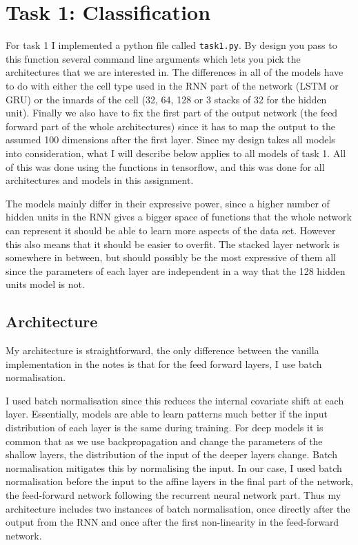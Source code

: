 \documentclass{article}
\begin{document}
\section{Task 1: Classification}

For task 1 I implemented a python file called \texttt{task1.py}. By design you
pass to this function several command line arguments which lets you pick the
architectures that we are interested in. The differences in all of the models
have to do with either the cell type used in the RNN part of the network (LSTM
or GRU) or the innards of the cell (32, 64, 128 or 3 stacks of 32 for the hidden
unit). Finally we also have to fix the first part of the output network (the
feed forward part of the whole architectures) since it has to map the output to
the assumed 100 dimensions after the first layer. Since my design takes all
models into consideration, what I will describe below applies to all models of
task 1. All of this was done using the functions in tensorflow, and this was
done for all architectures and models in this assignment.

The models mainly differ in their expressive power, since a higher number of
hidden units in the RNN gives a bigger space of functions that the whole network
can represent it should be able to learn more aspects of the data set. However
this also means that it should be easier to overfit. The stacked layer network
is somewhere in between, but should possibly be the most expressive of them all
since the parameters of each layer are independent in a way that the 128 hidden
units model is not.

\subsection{Architecture}

My architecture is straightforward, the only difference between the vanilla
implementation in the notes is that for the feed forward layers, I use batch
normalisation.

I used batch normalisation since this reduces the internal covariate shift at
each layer. Essentially, models are able to learn patterns much better if the
input distribution of each layer is the same during training. For deep models it is common that
as we use backpropagation and change the parameters of the shallow layers, the
distribution of the input of the deeper layers change. Batch normalisation
mitigates this by normalising the input. In our case, I used batch normalisation
before the input to the affine layers in the final part of the network, the
feed-forward network following the recurrent neural network part. Thus my
architecture includes two instances of batch normalisation, once directly after
the output from the RNN and once after the first non-linearity in the
feed-forward network.
\end{document}
